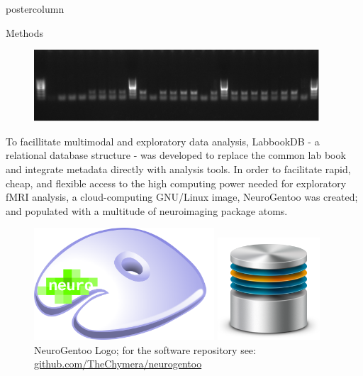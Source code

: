 \documentclass{beamer}
\begin{document}
\begin{frame}
\begin{columns}
\begin{column}{.57\textwidth}
\begin{beamercolorbox}[center]{postercolumn}
\begin{minipage}{.98\textwidth}
{\begin{myblock}{Methods}
\begin{figure}
\begin{minipage}{.45\textwidth}
								\centering\includegraphics[width=0.95\textwidth]{img/ag1}
							\end{minipage}
						\end{figure}
						\vspace{1em}
						To facillitate multimodal and exploratory data analysis,
						LabbookDB - a relational database structure - was developed to
						replace the common lab book and integrate metadata directly with
						analysis tools.
						In order to facilitate rapid, cheap, and flexible access to the
						high computing power needed for exploratory fMRI analysis, a
						cloud-computing GNU/Linux image, NeuroGentoo was created;
						and populated with a multitude of neuroimaging package atoms.
						\vspace{0.5em}
						\begin{figure}
							\begin{minipage}{0.43\textwidth}
								\centering\includegraphics[width=0.6\textwidth]{img/ng_large.png}
								\caption{NeuroGentoo Logo; for the software repository see:
										\href{https://github.com/TheChymera/neurogentoo}{github.com/TheChymera/neurogentoo}}
							\end{minipage}
							\hspace{1em}
							\begin{minipage}{0.45\textwidth}
								\centering\includegraphics[width=0.34\textwidth]{img/db.png}

\end{minipage}
\end{figure}
\end{myblock}}
\end{minipage}
\end{beamercolorbox}
\end{column}
\end{columns}
\end{frame}
\end{document}
